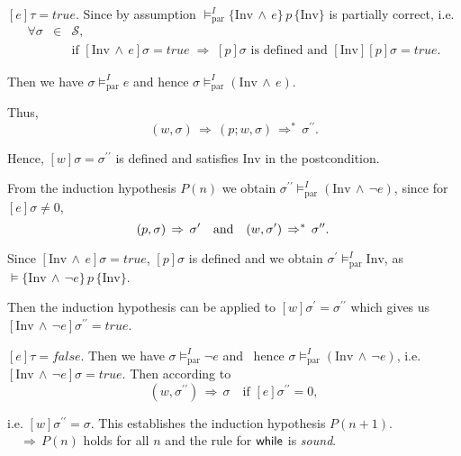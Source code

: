 \begin{description}
\item[\textbf{case} \textit{i)}] $[e]\tau =true$. Since by assumption $%
\vDash _{\mathrm{par}}^{I}\{\mathrm{Inv}\,\wedge \,e\}\,p\,\{\mathrm{Inv}\}$
is partially correct, i.e.%
\begin{eqnarray*}
\forall \sigma  &\in &\mathcal{S}, \\
&&\text{if }[\mathrm{Inv}\,\wedge \,e]\sigma =true\;\Rightarrow \;[p]\sigma 
\text{ is defined and }[\mathrm{Inv}][p]\sigma =true.
\end{eqnarray*}

\item Then we have $\sigma \vDash _{\mathrm{par}}^{I}e$ and hence $\sigma
\vDash _{\mathrm{par}}^{I}(\mathrm{Inv}\,\wedge \,e)$.

\item Thus,%
\begin{equation*}
(w,\sigma )\,\Rightarrow \,(p;w,\sigma )\,\Rightarrow ^{\ast }\,\sigma
^{\prime \prime }.
\end{equation*}

\item Hence, $[w]\sigma =\sigma ^{\prime \prime }$ is defined and satisfies $%
\mathrm{Inv}$ in the postcondition.

\item From the induction hypothesis $P(n)$ we obtain $\sigma ^{\prime \prime
}\vDash _{\mathrm{par}}^{I}(\mathrm{Inv}\,\wedge \,\lnot e)$, since for $%
[e]\sigma \neq 0$,%
\begin{equation*}
(p,\sigma )\,\Rightarrow \,\sigma ^{\prime }\quad \text{and\quad }(w,\sigma
^{\prime })\,\Rightarrow ^{\ast }\,\sigma ^{\prime \prime }.\,
\end{equation*}

\item Since $[\mathrm{Inv}\,\wedge \,e]\sigma =true$, $[p]\sigma $ is
defined and we obtain $\sigma ^{\prime }\vDash _{\mathrm{par}}^{I}\mathrm{Inv%
}$, as $\vDash \{\mathrm{Inv}\,\wedge \,\lnot e\}\,p\,\{\mathrm{Inv}\}$.

\item Then the induction hypothesis can be applied to $[w]\sigma ^{\prime
}=\sigma ^{\prime \prime }$ which gives us $[\mathrm{Inv}\,\wedge \,\lnot
e]\sigma ^{\prime \prime }=true$.

\item[\textbf{case} \textit{ii)}] $[e]\tau =false$. Then we have $\sigma
\vDash _{\mathrm{par}}^{I}\lnot e$ and \ hence $\sigma \vDash _{\mathrm{par}%
}^{I}(\mathrm{Inv}\,\wedge \,\lnot e)$, i.e. $[\mathrm{Inv}\,\wedge \,\lnot
e]\sigma =true$. Then according to%
\begin{equation*}
(w,\sigma ^{\prime \prime })\,\Rightarrow \,\sigma \quad \text{if }[e]\sigma
^{\prime \prime }=0,
\end{equation*}

\item i.e. $[w]\sigma ^{\prime \prime }=\sigma $. This establishes the
induction hypothesis $P(n+1)$.$\quad \Rightarrow \,P(n)$ holds for all $n$
and the rule for $\mbox{\sffamily while}$ is \textit{sound}.

\item 
\end{description}
